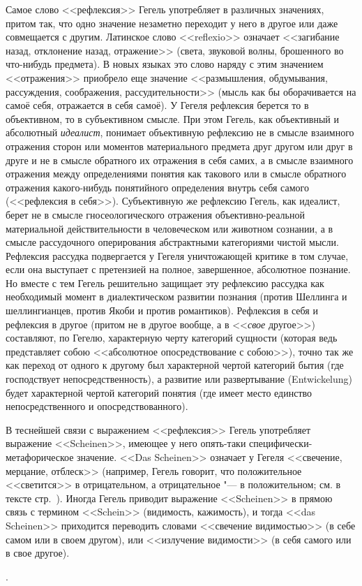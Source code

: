 {Самое слово <<рефлексия>> Гегель употребляет в различных значениях, притом
так, что одно значение незаметно переходит у него в другое или даже
совмещается с другим. Латинское слово <<reflexio>> означает <<загибание назад,
отклонение назад, отражение>> (света, звуковой волны, брошенного во
что-нибудь предмета). В новых языках это слово наряду с этим значением
<<отражения>> приобрело еще значение <<размышления, обдумывания, рассуждения,
соображения, рассудительности>> (мысль как бы оборачивается на самоё себя,
отражается в себя самоё). У Гегеля рефлексия берется то в объективном, то в
субъективном смысле. При этом Гегель, как объективный и абсолютный
{\em идеалист}, понимает объективную рефлексию не в смысле взаимного
отражения сторон или моментов материального предмета друг другом или друг в
друге и не в смысле обратного их отражения в себя самих, а в смысле
взаимного отражения между определениями понятия как такового или в смысле
обратного отражения какого-нибудь понятийного определения внутрь себя
самого (<<рефлексия в себя>>). Субъективную же рефлексию Гегель, как
идеалист, берет не в смысле гносеологического отражения объективно-реальной
материальной действительности в человеческом или животном сознании, а в
смысле рассудочного оперирования абстрактными категориями чистой мысли.
Рефлексия рассудка подвергается у Гегеля уничтожающей критике в том случае,
если она выступает с претензией на полное, завершенное, абсолютное
познание. Но вместе с тем Гегель решительно защищает эту рефлексию рассудка
как необходимый момент в диалектическом развитии познания (против Шеллинга
и шеллингианцев, против Якоби и против романтиков). Рефлексия в себя и
рефлексия в другое (притом не в другое вообще, а в <<{\em свое} другое>>)
составляют, по Гегелю, характерную черту категорий сущности (которая ведь
представляет собою <<абсолютное опосредствование с собою>>), точно так же как
переход от одного к другому был характерной чертой категорий бытия (где
господствует непосредственность), а развитие или развертывание
(Entwickelung) будет характерной чертой категорий понятия (где имеет место
единство непосредственного и опосредствованного).

В теснейшей связи с выражением <<рефлексия>> Гегель употребляет выражение
<<Scheinen>>, имеющее у него опять-таки специфически-метафорическое значение.
<<Das Scheinen>> означает у Гегеля <<свечение, мерцание, отблеск>> (например,
Гегель говорит, что положительное <<светится>> в отрицательном, а
отрицательное "--- в положительном; см. в тексте стр.~\pageref{scheinen}).
Иногда Гегель приводит выражение <<Scheinen>> в прямою связь с термином
<<Schein>> (видимость, кажимость), и тогда <<das Scheinen>> приходится
переводить словами <<свечение видимостью>> (в себе самом или в своем другом),
или <<излучение видимости>> (в себя самого или в свое другое).}.
